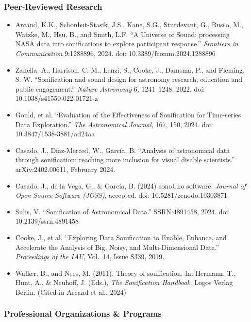 \documentclass[11pt,letterpaper]{article}
\begin{document}
\subsubsection{Peer-Reviewed Research}

\begin{itemize}
  \item Arcand, K.K., Schonhut-Stasik, J.S., Kane, S.G., Sturdevant, G., Russo, M., Watzke, M., Hsu, B., and Smith, L.F. ``A Universe of Sound: processing NASA data into sonifications to explore participant response.'' \textit{Frontiers in Communication} 9:1288896, 2024. doi: 10.3389/fcomm.2024.1288896
  \item Zanella, A., Harrison, C. M., Lenzi, S., Cooke, J., Damsma, P., and Fleming, S. W. ``Sonification and sound design for astronomy research, education and public engagement.'' \textit{Nature Astronomy} 6, 1241--1248, 2022. doi: 10.1038/s41550-022-01721-z
  \item Gould, et al. ``Evaluation of the Effectiveness of Sonification for Time-series Data Exploration.'' \textit{The Astronomical Journal}, 167, 150, 2024. doi: 10.3847/1538-3881/ad24aa
  \item Casado, J., Diaz-Merced, W., García, B. ``Analysis of astronomical data through sonification: reaching more inclusion for visual disable scientists.'' arXiv:2402.00611, February 2024.
  \item Casado, J., de la Vega, G., \& García, B. (2024) sonoUno software. \textit{Journal of Open Source Software (JOSS)}, accepted. doi: 10.5281/zenodo.10303871
  \item Sulis, V. ``Sonification of Astronomical Data.'' SSRN:4891458, 2024. doi: 10.2139/ssrn.4891458
  \item Cooke, J., et al. ``Exploring Data Sonification to Enable, Enhance, and Accelerate the Analysis of Big, Noisy, and Multi-Dimensional Data.'' \textit{Proceedings of the IAU}, Vol.\ 14, Issue S339, 2019.
  \item Walker, B., and Nees, M. (2011). Theory of sonification. In: Hermann, T., Hunt, A., \& Neuhoff, J. (Eds.), \textit{The Sonification Handbook}. Logos Verlag Berlin. (Cited in Arcand et al., 2024)
\end{itemize}

\subsubsection{Professional Organizations \& Programs}
\end{document}
